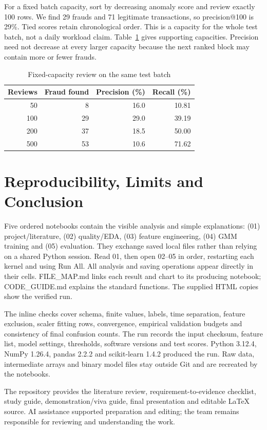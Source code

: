 \documentclass[conference]{IEEEtran}
\begin{document}
For a fixed batch capacity, sort by decreasing anomaly score and review exactly 100 rows. We find 29 frauds and 71 legitimate transactions, so precision@100 is 29\%. Tied scores retain chronological order. This is a capacity for the whole test batch, not a daily workload claim. Table~\ref{tab:capacity} gives supporting capacities. Precision need not decrease at every larger capacity because the next ranked block may contain more or fewer frauds.
\begin{table}[!t]\centering\caption{Fixed-capacity review on the same test batch}\label{tab:capacity}
\begin{tabular}{rrrr}\hline
Reviews & Fraud found & Precision (\%) & Recall (\%)\\\hline
50 & 8 & 16.0 & 10.81\\
100 & 29 & 29.0 & 39.19\\
200 & 37 & 18.5 & 50.00\\
500 & 53 & 10.6 & 71.62\\
\hline\end{tabular}\end{table}

\newpage
\section{Reproducibility, Limits and Conclusion}
Five ordered notebooks contain the visible analysis and simple explanations: (01) project/literature, (02) quality/EDA, (03) feature engineering, (04) GMM training and (05) evaluation. They exchange saved local files rather than relying on a shared Python session. Read 01, then open 02--05 in order, restarting each kernel and using Run All. All analysis and saving operations appear directly in their cells. FILE\_MAP.md links each result and chart to its producing notebook; CODE\_GUIDE.md explains the standard functions. The supplied HTML copies show the verified run.

The inline checks cover schema, finite values, labels, time separation, feature exclusion, scaler fitting rows, convergence, empirical validation budgets and consistency of final confusion counts. The run records the input checksum, feature list, model settings, thresholds, software versions and test scores. Python 3.12.4, NumPy 1.26.4, pandas 2.2.2 and scikit-learn 1.4.2 produced the run. Raw data, intermediate arrays and binary model files stay outside Git and are recreated by the notebooks.

The repository provides the literature review, requirement-to-evidence checklist, study guide, demonstration/viva guide, final presentation and editable LaTeX source. AI assistance supported preparation and editing; the team remains responsible for reviewing and understanding the work.
\end{document}
